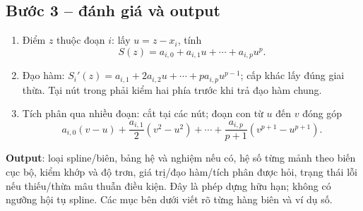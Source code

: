\subsection{Bước 3 -- đánh giá và output}
\begin{enumerate}
\item Điểm $z$ thuộc đoạn $i$: lấy $u=z-x_i$, tính
\[
S(z)=a_{i,0}+a_{i,1}u+\cdots+a_{i,p}u^p.
\]
\item Đạo hàm: $S_i'(z)=a_{i,1}+2a_{i,2}u+\cdots+pa_{i,p}u^{p-1}$; cấp khác lấy đúng giai thừa. Tại nút trong phải kiểm hai phía trước khi trả đạo hàm chung.
\item Tích phân qua nhiều đoạn: cắt tại các nút; đoạn con từ $u$ đến $v$ đóng góp
\[
a_{i,0}(v-u)+\frac{a_{i,1}}2(v^2-u^2)+\cdots+\frac{a_{i,p}}{p+1}(v^{p+1}-u^{p+1}).
\]
\end{enumerate}
\textbf{Output}: loại spline/biên, bảng hệ và nghiệm nếu có, hệ số từng mảnh theo biến cục bộ, kiểm khớp và độ trơn, giá trị/đạo hàm/tích phân được hỏi, trạng thái lỗi nếu thiếu/thừa mâu thuẫn điều kiện. Đây là phép dựng hữu hạn; không có ngưỡng hội tụ spline. Các mục bên dưới viết rõ từng hàng biên và ví dụ số.
